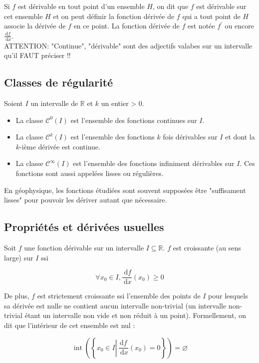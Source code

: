 Si $f$ est dérivable en tout point d'un ensemble $H$, on dit que $f$ est dérivable sur cet ensemble $H$ et on peut définir la fonction dérivée de $f$ qui a tout point de $H$ associe la dérivée de $f$ en ce point. La fonction dérivée de $f$ est notée $f^{\prime}$ ou encore $\frac{\mathrm{d} f}{\mathrm{~d} x}$.\\

ATTENTION: "Continue", "dérivable" sont des adjectifs valabes sur un intervalle qu'il FAUT préciser !!

\subsection{Classes de régularité}

Soient $I$ un intervalle de $\mathbb{R}$ et $k$ un entier > 0.
\begin{itemize}
    \item La classe $\mathcal{C}^0(I)$ est l'ensemble des fonctions continues sur $I$.
    \item La classe $\mathcal{C}^k(I)$ est l'ensemble des fonctions $k$ fois dérivables sur $I$ et dont la $k$-ième dérivée est continue.
    \item La classe $\mathcal{C}^{\infty}(I)$ est l'ensemble des fonctions infiniment dérivables sur $I$. Ces fonctions sont aussi appelées lisses ou régulières.
\end{itemize}

En géophysique, les fonctions étudiées sont souvent supposées être "suffisament lisses" pour pouvoir les dériver autant que nécessaire.

\subsection{Propriétés et dérivées usuelles}
Soit $f$ une fonction dérivable sur un intervalle $I \subseteq \mathbb{R}$.
$f$ est croissante (au sens large) sur $I$ ssi

$$
\forall x_0 \in I, \frac{\mathrm{~d} f}{\mathrm{~d} x}\left(x_0\right) \geqslant 0
$$


De plus, $f$ est strictement croissante ssi l'ensemble des points de $I$ pour lesquels sa dérivée est nulle ne contient aucun intervalle non-trivial (un intervalle non-trivial étant un intervalle non vide et non réduit à un point). Formellement, on dit que l'intérieur de cet ensemble est nul :

$$
\operatorname{int}\left(\left\{x_0 \in I \left\lvert\, \frac{\mathrm{d} f}{\mathrm{~d} x}\left(x_0\right)=0\right.\right\}\right)=\varnothing
$$

